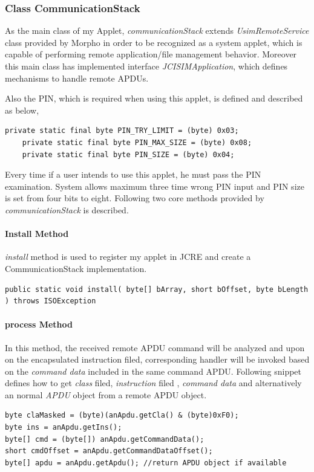 \subsubsection{Class CommunicationStack} \sloppy
As the main class of my Applet, \emph{communicationStack} extends \emph{UsimRemoteService} class provided by Morpho in order to be recognized as a system applet, which is capable of performing remote application/file management behavior. Moreover this main class has implemented interface \emph{JCISIMApplication}, which defines mechanisms to handle remote APDUs.

Also the PIN, which is required when using this applet,  is defined and described as below, 

\begin{Verbatim}[fontsize=\relsize{-1}]
    private static final byte PIN_TRY_LIMIT = (byte) 0x03;
    private static final byte PIN_MAX_SIZE = (byte) 0x08;
    private static final byte PIN_SIZE = (byte) 0x04;
\end{Verbatim}
Every time if a user intends to use this applet, he must pass the PIN examination.
System allows maximum three time wrong PIN input and PIN size is set from four bits to eight.
Following two core methods provided by \emph{communicationStack} is described.
\paragraph{Install Method}
\emph{install} method is used to register my applet in JCRE and create a CommunicationStack implementation.
\begin{Verbatim}[fontsize=\relsize{-2.0}, frame=lines,framesep=4mm, label=\fbox{\small\emph{doVerifyPIN Handler}}]
public static void install( byte[] bArray, short bOffset, byte bLength ) throws ISOException
\end{Verbatim}

\paragraph{process Method} \label{secDummy}
In this method, the received remote APDU command will be analyzed and upon on the encapsulated instruction filed, corresponding handler will be invoked based on the \emph{command data} included in the same command APDU. Following snippet defines how to get \emph{class} filed, \emph{instruction} filed , \emph{command data} and alternatively an normal \emph{APDU} object from a remote APDU object.


\begin{Verbatim}[frame=lines,framesep=4mm, label=\fbox{\small\emph{Remote APDU Operation}}]
byte claMasked = (byte)(anApdu.getCla() & (byte)0xF0);
byte ins = anApdu.getIns();
byte[] cmd = (byte[]) anApdu.getCommandData();	    
short cmdOffset = anApdu.getCommandDataOffset();
byte[] apdu = anApdu.getApdu(); //return APDU object if available
\end{Verbatim}

